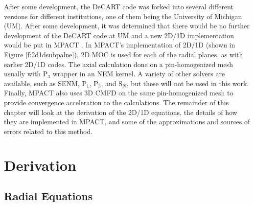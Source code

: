After some development, the DeCART code was forked into several different versions for different institutions, one of them being the University of Michigan (UM).  After some development, it was determined that there would be no further development of the DeCART code at UM and a new 2D/1D implementation would be put in MPACT \cite{2D1DApproxTo3DTransport1,StabilityAndAccuracyOf3DTransportInMPACT}.  In MPACT's implementation of 2D/1D (shown in Figure \ref{f:2d1dsubpalne}), 2D MOC is used for each of the radial planes, as with earlier 2D/1D codes.  The axial calculation done on a pin-homogenized mesh usually with P$_3$ wrapper in an NEM kernel.  A variety of other solvers are available, such as SENM, P$_1$, P$_3$, and S$_N$, but these will not be used in this work.  Finally, MPACT also uses 3D CMFD on the same pin-homogenized mesh to provide convergence acceleration to the calculations.  The remainder of this chapter will look at the derivation of the 2D/1D equations, the details of how they are implemented in MPACT, and some of the approximations and sources of errors related to this method.

\section{Derivation}

\subsection{Radial Equations}\label{ss:2d1dradialEq}

